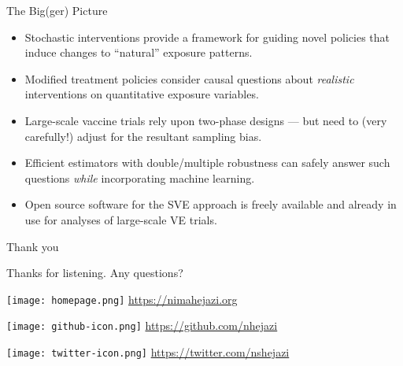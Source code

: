 \documentclass{beamer}
\begin{document}


\begin{frame}[c]{The Big(ger) Picture}

\begin{center}
\begin{itemize}
  \itemsep8pt
  \item Stochastic interventions provide a framework for guiding novel policies
    that induce changes to ``natural'' exposure patterns.
  \item Modified treatment policies consider causal questions about
    \textit{realistic} interventions on quantitative exposure variables.
  \item Large-scale vaccine trials rely upon two-phase designs --- but need to
    (very carefully!) adjust for the resultant sampling bias.
  \item Efficient estimators with double/multiple robustness can safely answer
    such questions \textit{while} incorporating machine learning.
  \item Open source software for the SVE approach is freely available and
    already in use for analyses of large-scale VE trials.
\end{itemize}
\end{center}

\note{
}

\end{frame}


\begin{frame}[c]{Thank you}

\Large{Thanks for listening. Any questions?}

\vspace{2mm}
\texttt{[image: homepage.png]} \url{https://nimahejazi.org}

\vspace{2mm}
\texttt{[image: github-icon.png]}
  \url{https://github.com/nhejazi}

\vspace{2mm}
\texttt{[image: twitter-icon.png]}
  \url{https://twitter.com/nshejazi}

\end{frame}

\end{document}
